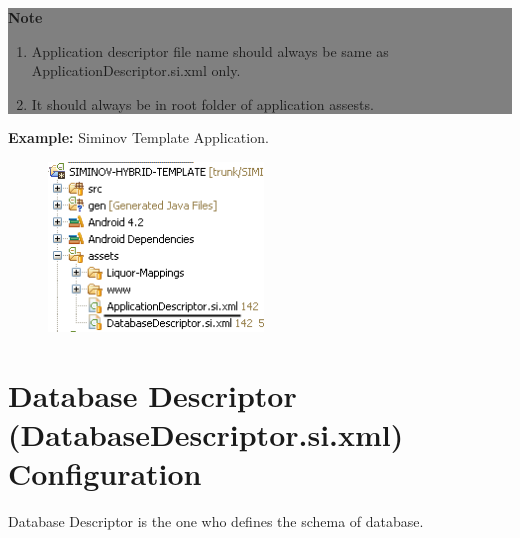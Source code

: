 \begin{center}
	\colorbox{grey}{
		\parbox[t]{.8\linewidth}{
			\fontsize{11pt}{11pt}\selectfont %
			\vspace*{0.1cm} %
		
			\hfill \textbf{Note} \\

			\hfill 	
			\begin{enumerate}
			
				\item \small Application descriptor file name should always be same as ApplicationDescriptor.si.xml only.

				\item \small It should always be in root folder of application assests.

			\end{enumerate}

			\vspace*{0.0cm} %
		}
}

\end{center}

	\par
		\textbf{Example:} Siminov Template Application.
		\begin{figure}[htbp]
			\centering
				\includegraphics[height=4.5cm]{Resources/siminov_hybrid_template_application_descriptor_path_example.png}
		\end{figure}


\newpage
\section{Database Descriptor (DatabaseDescriptor.si.xml) Configuration}
	Database Descriptor is the one who defines the schema of database.
	
